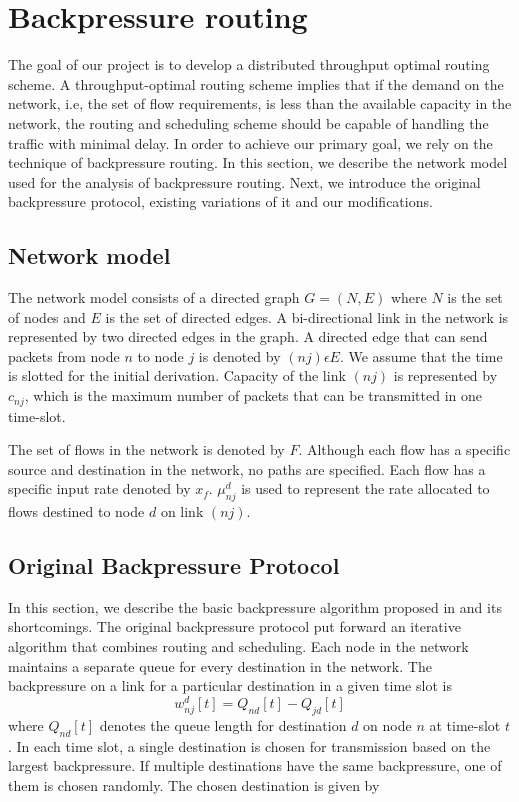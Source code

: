 \label{sec:backPressure}
\section{Backpressure routing}
The goal of our project is to develop a distributed throughput optimal routing scheme. A throughput-optimal routing scheme implies that if the demand on the network, i.e, the set of flow requirements, is less than the available capacity in the network, the routing and scheduling scheme should be capable of handling the traffic with minimal delay. In order to achieve our primary goal, we rely on the technique of backpressure routing. In this section, we describe the network model used for the analysis of backpressure routing. Next, we introduce the original backpressure protocol, existing variations of it and our modifications.

\subsection{Network model}
The network model consists of a directed graph $G=(N,E)$ where $N$ is the set of nodes and $E$ is the set of directed edges. A bi-directional link in the network is represented by two directed edges in the graph. A directed edge that can send packets from node $n$ to node $j$ is denoted by $(nj) \epsilon E$. We assume that the time is slotted for the initial derivation. Capacity of the link $(nj)$ is represented by $c_{nj}$, which is the maximum number of packets that can be transmitted in one time-slot.

The set of flows in the network is denoted by $F$. Although each flow has a specific source and destination in the network, no paths are specified. Each flow has a specific input rate denoted by $x_{f}$. $\mu_{nj}^{d}$ is used to represent the rate allocated to flows destined to node $d$ on link $(nj)$.

\subsection{Original Backpressure Protocol}
In this section, we describe the basic backpressure algorithm proposed in \cite{BP-orig} and its shortcomings. The original backpressure protocol put forward an iterative algorithm that combines routing and scheduling. Each node in the network maintains a separate queue for every destination in the network. The backpressure on a link for a particular destination in a given time slot is 
\begin{equation}
w_{nj}^{d}[t] = Q_{nd}[t] - Q_{jd}[t]
\end{equation}
where $Q_{nd}[t]$ denotes the queue length for destination $d$ on node $n$ at time-slot $t$. In each time slot, a single destination is chosen for transmission based on the largest backpressure. If multiple destinations have the same backpressure, one of them is chosen randomly. The chosen destination is given by


